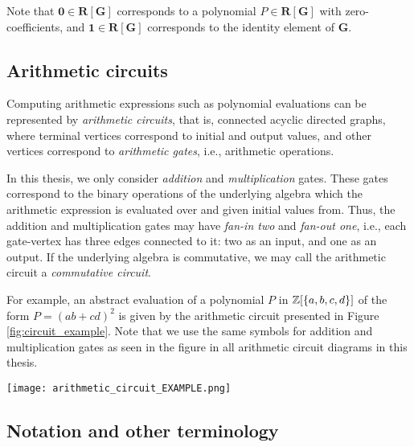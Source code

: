 Note that $\mathbf{0} \in \mathbf{R}[\mathbf{G}]$ corresponds to a 
polynomial $P \in \mathbf{R}[\mathbf{G}]$ with zero-coefficients, and 
$\mathbf{1} \in \mathbf{R}[\mathbf{G}]$ corresponds to the identity element of $\mathbf{G}$. 


\subsection{Arithmetic circuits}
\label{sect:prelims_circuits}

Computing arithmetic expressions such as polynomial evaluations 
can be represented by \emph{arithmetic circuits}, that is, 
connected acyclic directed graphs, where terminal vertices correspond to initial and output values, 
and other vertices correspond to \emph{arithmetic gates}, i.e., arithmetic operations. 

In this thesis, we only consider \emph{addition} and \emph{multiplication} gates. 
These gates correspond to the binary operations of the underlying algebra  
which the arithmetic expression is evaluated over and given initial values from. Thus, 
the addition and multiplication gates may have \emph{fan-in two} and \emph{fan-out one}, 
i.e., each gate-vertex has three edges connected to it: two as an input, and one as an output. 
If the underlying algebra is commutative, we may call the arithmetic circuit a \emph{commutative circuit}. 

For example, an abstract evaluation of a polynomial $P$ in $\mathbb Z[\{a,b,c,d\}]$ of the form 
$P = (ab+cd)^2$ is given by the arithmetic circuit presented in Figure \ref{fig:circuit_example}. 
Note that we use the same symbols for addition and multiplication gates as seen in the figure 
in all arithmetic circuit diagrams in this thesis.

\begin{SCfigure}[0.5][h]
  \caption{A circuit for evaluating $(ab+cd)^2$. 
  Note that the input terminals have been copied for clarity.}
  \texttt{[image: arithmetic\_circuit\_EXAMPLE.png]}
  \centering
  \label{fig:circuit_example}
\end{SCfigure}

\subsection{Notation and other terminology} 
\label{sect:prelims_other}

